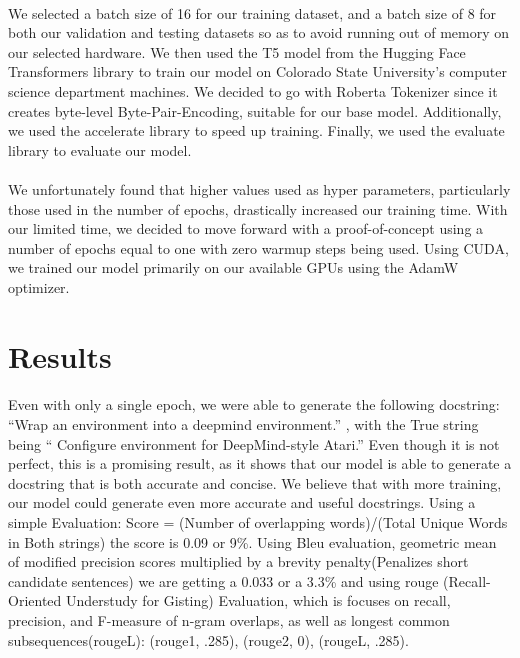 \documentclass[12pt]{article}
\begin{document}
	\paragraph{} We selected a batch size of 16 for our training dataset, and a batch size of 8 for both our validation and testing datasets so as to avoid running out of memory on our selected hardware. We then used the T5 model from the Hugging Face Transformers library to train our model on Colorado State University's computer science department machines. We decided to go with Roberta Tokenizer since it creates byte-level Byte-Pair-Encoding, suitable for our base model. Additionally, we used the accelerate library to speed up training. Finally, we used the evaluate library to evaluate our model.
	\paragraph{} We unfortunately found that higher values used as hyper parameters, particularly those used in the number of epochs, drastically increased our training time. With our limited time, we decided to move forward with a proof-of-concept using a number of epochs equal to one with zero warmup steps being used. Using CUDA, we trained our model primarily on our available GPUs using the AdamW optimizer.

	\section{Results}
	\paragraph{} Even with only a single epoch, we were able to generate the following docstring: “Wrap an environment into a deepmind environment.” , with the True string being “ Configure environment for DeepMind-style Atari.” Even though it is not perfect, this is a promising result, as it shows that our model is able to generate a docstring that is both accurate and concise. We believe that with more training, our model could generate even more accurate and useful docstrings. Using a simple Evaluation: Score = (Number of overlapping words)/(Total Unique Words in Both strings) the score is 0.09 or 9\%. Using Bleu evaluation, geometric mean of modified precision scores multiplied by a brevity penalty(Penalizes short candidate sentences) we are getting a 0.033 or a 3.3\% and using rouge (Recall-Oriented Understudy for Gisting) Evaluation, which is focuses on recall, precision, and F-measure of n-gram overlaps, as well as longest common subsequences(rougeL): (rouge1, .285), (rouge2, 0), (rougeL, .285).
\end{document}
